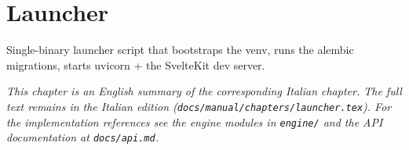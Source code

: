 \chapter{Launcher}
\label{ch:launcher_en}

Single-binary launcher script that bootstraps the venv, runs the alembic migrations, starts uvicorn + the SvelteKit dev server.

\medskip
\noindent
\textit{This chapter is an English summary of the corresponding Italian chapter. The full text remains in the Italian edition (\texttt{docs/manual/chapters/launcher.tex}). For the implementation references see the engine modules in \texttt{engine/} and the API documentation at \texttt{docs/api.md}.}
